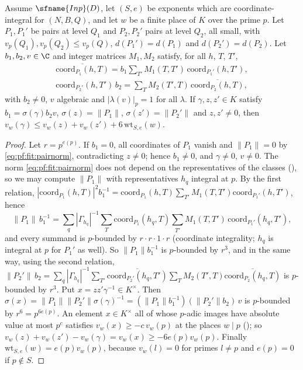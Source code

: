 \begin{lemma}\label{pf:fit:lemmaC}
Assume $\sfname{Inp}(D)$, let $(S,e)$ be exponents which are coordinate-integral for $(N,B,Q)$, and let $w$ be a finite place
of $K$ over the prime $p$. Let $P_1,P_1'$ be pairs at level $Q_1$ and $P_2,P_2'$ pairs at level $Q_2$, all small, with
$v_p(Q_1),v_p(Q_2)\le v_p(Q)$, $d(P_1')=d(P_1)$ and $d(P_2')=d(P_2)$. Let $b_1,b_2,v\in\C$ and integer matrices $M_1,M_2$
satisfy, for all $h$, $T$, $T'$,
\begin{gather*}
\overline{\mathrm{coord}_{P_1}(h,T)}=b_1\sum_{T'}M_1(T,T')\,\mathrm{coord}_{P_1'}(h,T'),\\
\mathrm{coord}_{P_2'}(h,T')\,b_2=\sum_TM_2(T',T)\,\overline{\mathrm{coord}_{P_2}(h,T)},
\end{gather*}
with $b_2\ne0$, $v$ algebraic and $|\lambda(v)|_p=1$ for all $\lambda$. If $\gamma,z,z'\in K$ satisfy $b_1=\sigma(\gamma)b_2v$,
$\sigma(z)=\|P_1\|$, $\sigma(z')=\|P_2'\|$ and $z,z'\ne0$, then $v_w(\gamma)\le v_w(z)+v_w(z')+6\,\mathrm{wt}_{S,e}(w)$.
\end{lemma}

\begin{proof}
Let $r=p^{e(p)}$. If $b_1=0$, all coordinates of $P_1$ vanish and $\|P_1\|=0$ by \eqref{eq:pf:fit:pairnorm}, contradicting
$z\ne0$; hence $b_1\ne0$, and $\gamma\ne0$, $v\ne0$. The norm \eqref{eq:pf:fit:pairnorm} does not depend on the representatives
of the classes (), so we may compute
$\|P_1\|$ with representatives $h_q$ integral at $p$. By the first relation,
$|\mathrm{coord}_{P_1}(h,T)|^2b_1^{-1}=\mathrm{coord}_{P_1}(h,T)\sum_{T'}M_1(T,T')\mathrm{coord}_{P_1'}(h,T')$, hence
\[
\|P_1\|\,b_1^{-1}=\sum_q|\Gamma_{h_q}|^{-1}\sum_T\mathrm{coord}_{P_1}(h_q,T)\sum_{T'}M_1(T,T')\,\mathrm{coord}_{P_1'}(h_q,T'),
\]
and every summand is $p$-bounded by $r\cdot r\cdot1\cdot r$ (coordinate integrality; $h_q$ is integral at $p$ for $P_1'$ as
well). So $\|P_1\|b_1^{-1}$ is $p$-bounded by $r^3$, and in the same way, using the second relation,
$\|P_2'\|\,b_2=\sum_q|\Gamma_{h_q}|^{-1}\sum_{T'}\overline{\mathrm{coord}_{P_2'}(h_q,T')}\sum_TM_2(T',T)
\overline{\mathrm{coord}_{P_2}(h_q,T)}$ is $p$-bounded by $r^3$. Put $x=zz'\gamma^{-1}\in K^\times$. Then
$\sigma(x)=\|P_1\|\|P_2'\|\sigma(\gamma)^{-1}=(\|P_1\|b_1^{-1})(\|P_2'\|b_2)\,v$ is $p$-bounded by $r^6=p^{6e(p)}$. An element
$x\in K^\times$ all of whose $p$-adic images have absolute value at most $p^c$ satisfies $v_w(x)\ge-c\,v_w(p)$ at the places
$w\mid p$ (); so $v_w(z)+v_w(z')-v_w(\gamma)=v_w(x)\ge-6e(p)v_w(p)$.
Finally $\mathrm{wt}_{S,e}(w)=e(p)v_w(p)$, because $v_w(l)=0$ for primes $l\ne p$ and $e(p)=0$ if $p\notin S$.
\end{proof}

